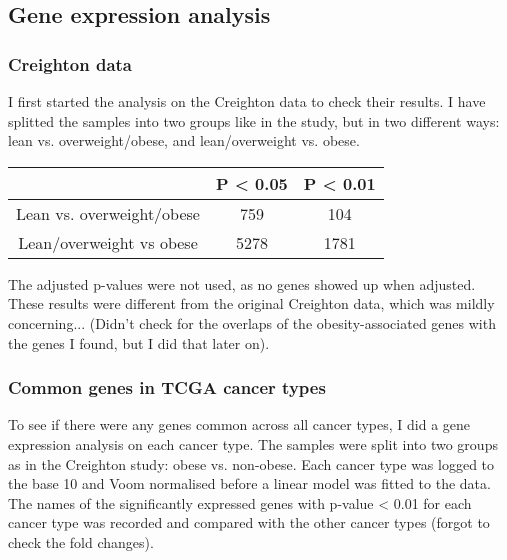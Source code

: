 \documentclass[a4paper, 11pt]{article}
\begin{document}
\subsection*{Gene expression analysis}

\subsubsection*{Creighton data}

I first started the analysis on the Creighton data to check their results.
I have splitted the samples into two groups like in the study, but in two different ways: lean vs. overweight/obese, and lean/overweight vs. obese.

\begin{center}
	\begin{tabular}{ccc}
                                  & P \textless{} 0.05 & P \textless{} 0.01 \\
		\hline
		Lean vs. overweight/obese & 759              & 104              \\
		Lean/overweight vs obese  & 5278             & 1781             \\
	\end{tabular}
\end{center}

The adjusted p-values were not used, as no genes showed up when adjusted.
These results were different from the original Creighton data, which was mildly concerning...
(Didn't check for the overlaps of the obesity-associated genes with the genes I found, but I did that later on).

\subsubsection*{Common genes in TCGA cancer types}

To see if there were any genes common across all cancer types, I did a gene expression analysis on each cancer type.
The samples were split into two groups as in the Creighton study: obese vs. non-obese.
Each cancer type was logged to the base 10 and Voom normalised before a linear model was fitted to the data.
The names of the significantly expressed genes with p-value \textless{} 0.01 for each cancer type was recorded and compared with the other cancer types (forgot to check the fold changes).
\end{document}
